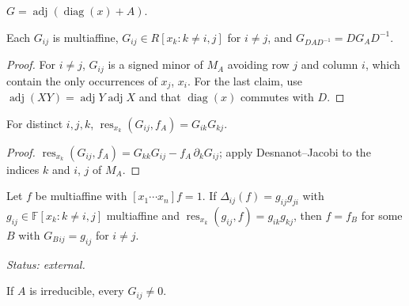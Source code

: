 \begin{definition}
\label{def:adjpoly}
\leanok
{}
$G=\operatorname{adj}(\operatorname{diag}(x)+A)$.
\end{definition}

\begin{lemma}[Entries of $G$]
\label{lem:adjpoly-props}
\leanok
{}
Each $G_{ij}$ is multiaffine, $G_{ij}\in R[x_k:k\ne i,j]$ for $i\ne j$, and
$G_{DAD^{-1}}=DG_AD^{-1}$.
\end{lemma}

\begin{proof}
For $i\ne j$, $G_{ij}$ is a signed minor of $M_A$ avoiding row $j$ and column $i$, which
contain the only occurrences of $x_j$, $x_i$. For the last claim, use
$\operatorname{adj}(XY)=\operatorname{adj}Y\operatorname{adj}X$ and that $\operatorname{diag}(x)$
commutes with $D$.
\end{proof}

\begin{lemma}
\label{lem:res-adjpoly}
\leanok
{}
For distinct $i,j,k$, $\operatorname{res}_{x_k}(G_{ij},f_A)=G_{ik}G_{kj}$.
\end{lemma}

\begin{proof}
$\operatorname{res}_{x_k}(G_{ij},f_A)=G_{kk}G_{ij}-f_A\,\partial_kG_{ij}$; apply
Desnanot--Jacobi to the indices $k$ and $i$, $j$ of $M_A$.
\end{proof}

\begin{theorem}
\label{thm:av22}
\leanok
{}
Let $f$ be multiaffine with $[x_1\cdots x_n]f=1$. If $\Delta_{ij}(f)=g_{ij}g_{ji}$ with
$g_{ij}\in\mathbb F[x_k:k\ne i,j]$ multiaffine and
$\operatorname{res}_{x_k}(g_{ij},f)=g_{ik}g_{kj}$, then $f=f_B$ for some $B$ with
$G_B{}_{ij}=g_{ij}$ for $i\ne j$.
\end{theorem}

\noindent\emph{Status: external.}

\begin{lemma}
\label{lem:42}
\leanok
{}
If $A$ is irreducible, every $G_{ij}\ne0$.
\end{lemma}

